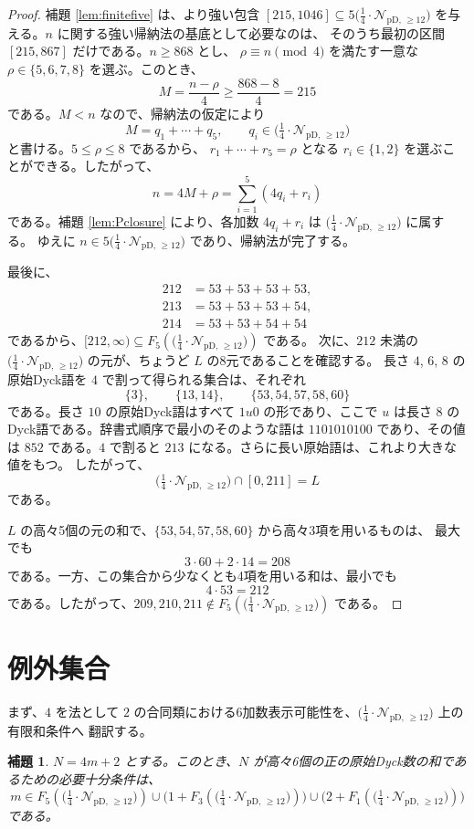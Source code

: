 \documentclass[12pt]{ltjsarticle}
\theoremstyle{plain}
\newtheorem{lemma}[theorem]{補題}
\newcommand{\Pset}{\bigl(\tfrac14\cdot
  \mathcal{N}_{\mathrm{pD},\,\geq12}\bigr)}
\begin{document}
\begin{proof}
補題 \ref{lem:finitefive} は、より強い包含
$[215,1046]\subseteq5\Pset$ を与える。$n$ に関する強い帰納法の基底として必要なのは、
そのうち最初の区間 $[215,867]$ だけである。$n\geq868$ とし、
$\rho\equiv n\pmod4$ を満たす一意な $\rho\in\{5,6,7,8\}$ を選ぶ。このとき、
\[
 M=\frac{n-\rho}{4}\geq\frac{868-8}{4}=215
\]
である。$M<n$ なので、帰納法の仮定により
\[
 M=q_1+\cdots+q_5,\qquad q_i\in\Pset
\]
と書ける。$5\leq \rho\leq8$ であるから、
$r_1+\cdots+r_5=\rho$ となる $r_i\in\{1,2\}$ を選ぶことができる。したがって、
\[
 n=4M+\rho=\sum_{i=1}^{5}(4q_i+r_i)
\]
である。補題 \ref{lem:Pclosure} により、各加数 $4q_i+r_i$ は $\Pset$ に属する。
ゆえに $n\in5\Pset$ であり、帰納法が完了する。

最後に、
\[
\begin{aligned}
212&=53+53+53+53,\\
213&=53+53+53+54,\\
214&=53+53+54+54
\end{aligned}
\]
であるから、$[212,\infty)\subseteq F_5(\Pset)$ である。
次に、$212$ 未満の $\Pset$ の元が、ちょうど $L$ の8元であることを確認する。
長さ $4$, $6$, $8$ の原始Dyck語を $4$ で割って得られる集合は、それぞれ
\[
 \{3\},\qquad \{13,14\},\qquad \{53,54,57,58,60\}
\]
である。長さ $10$ の原始Dyck語はすべて $1u0$ の形であり、ここで $u$ は長さ $8$ の
Dyck語である。辞書式順序で最小のそのような語は $1101010100$ であり、その値は
$852$ である。$4$ で割ると $213$ になる。さらに長い原始語は、これより大きな値をもつ。
したがって、
\[
 \Pset\cap[0,211]=L
\]
である。

$L$ の高々5個の元の和で、$\{53,54,57,58,60\}$ から高々3項を用いるものは、
最大でも
\[
 3\cdot60+2\cdot14=208
\]
である。一方、この集合から少なくとも4項を用いる和は、最小でも
\[
 4\cdot53=212
\]
である。したがって、$209,210,211\notin F_5(\Pset)$ である。
\end{proof}

\section{例外集合}\label{sec:exceptions}

まず、$4$ を法として $2$ の合同類における6加数表示可能性を、$\Pset$ 上の有限和条件へ
翻訳する。

\begin{lemma}\label{lem:sixcriterion}
$N=4m+2$ とする。このとき、$N$ が高々6個の正の原始Dyck数の和であるための必要十分条件は、
\[
 m\in F_5(\Pset)
 \cup\bigl(1+F_3(\Pset)\bigr)
 \cup\bigl(2+F_1(\Pset)\bigr)
\]
である。
\end{lemma}
\end{document}

